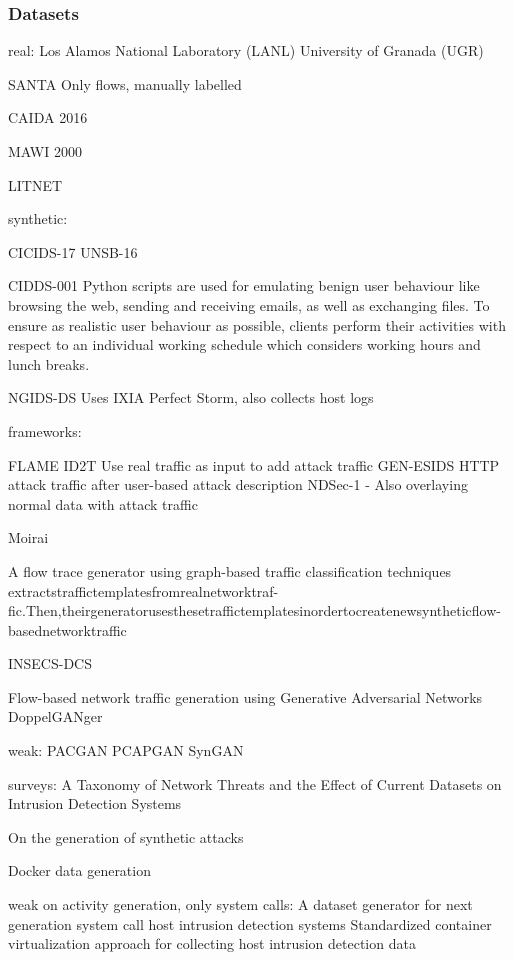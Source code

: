 \documentclass{article}
\begin{document}
\subsubsection{Datasets}

real:
Los Alamos National Laboratory (LANL)
University of Granada (UGR)

SANTA
Only flows, manually labelled


CAIDA 2016

MAWI 2000

LITNET

synthetic:

CICIDS-17
UNSB-16

CIDDS-001
Python scripts are used for emulating benign user behaviour like browsing the web, sending and receiving emails, as well as exchanging files. To ensure as realistic user behaviour as possible, clients perform their activities with respect to an individual working schedule which considers working hours and lunch breaks.

NGIDS-DS
Uses IXIA Perfect Storm, also collects host logs



frameworks:

FLAME
ID2T
Use real traffic as input to add attack traffic
GEN-ESIDS
HTTP attack traffic after user-based attack description
NDSec-1 - Also overlaying normal data with attack traffic

Moirai


A flow trace generator using graph-based traffic classification techniques
extractstraffictemplatesfromrealnetworktraf-fic.Then,theirgeneratorusesthesetraffictemplatesinordertocreatenewsyntheticflow-basednetworktraffic

INSECS-DCS




Flow-based network traffic generation using Generative Adversarial Networks
DoppelGANger

weak:
PACGAN
PCAPGAN
SynGAN


surveys:
A Taxonomy of Network Threats and the Effect of Current Datasets on Intrusion Detection Systems

On the generation of synthetic attacks


Docker data generation 

weak on activity generation, only system calls:
A dataset generator for next generation system call host intrusion detection systems
Standardized container virtualization approach for collecting host intrusion detection data
\end{document}
